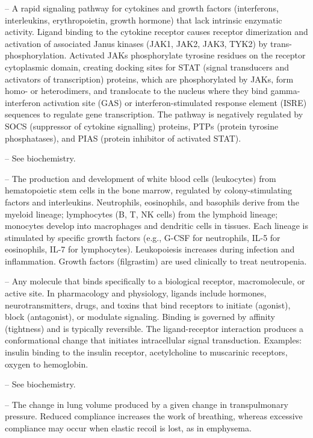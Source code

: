 -- A rapid signaling pathway for cytokines and growth factors (interferons, interleukins, erythropoietin, growth hormone) that lack intrinsic enzymatic activity. Ligand binding to the cytokine receptor causes receptor dimerization and activation of associated Janus kinases (JAK1, JAK2, JAK3, TYK2) by trans-phosphorylation. Activated JAKs phosphorylate tyrosine residues on the receptor cytoplasmic domain, creating docking sites for STAT (signal transducers and activators of transcription) proteins, which are phosphorylated by JAKs, form homo- or heterodimers, and translocate to the nucleus where they bind gamma-interferon activation site (GAS) or interferon-stimulated response element (ISRE) sequences to regulate gene transcription. The pathway is negatively regulated by SOCS (suppressor of cytokine signalling) proteins, PTPs (protein tyrosine phosphatases), and PIAS (protein inhibitor of activated STAT).

-- See biochemistry.

-- The production and development of white blood cells (leukocytes) from hematopoietic stem cells in the bone marrow, regulated by colony-stimulating factors and interleukins. Neutrophils, eosinophils, and basophils derive from the myeloid lineage; lymphocytes (B, T, NK cells) from the lymphoid lineage; monocytes develop into macrophages and dendritic cells in tissues. Each lineage is stimulated by specific growth factors (e.g., G-CSF for neutrophils, IL-5 for eosinophils, IL-7 for lymphocytes). Leukopoiesis increases during infection and inflammation. Growth factors (filgrastim) are used clinically to treat neutropenia.

-- Any molecule that binds specifically to a biological receptor, macromolecule, or active site. In pharmacology and physiology, ligands include hormones, neurotransmitters, drugs, and toxins that bind receptors to initiate (agonist), block (antagonist), or modulate signaling. Binding is governed by affinity (tightness) and is typically reversible. The ligand-receptor interaction produces a conformational change that initiates intracellular signal transduction. Examples: insulin binding to the insulin receptor, acetylcholine to muscarinic receptors, oxygen to hemoglobin.

-- See biochemistry.

-- The change in lung volume produced by a given change in transpulmonary pressure. Reduced compliance increases the work of breathing, whereas excessive compliance may occur when elastic recoil is lost, as in emphysema.

